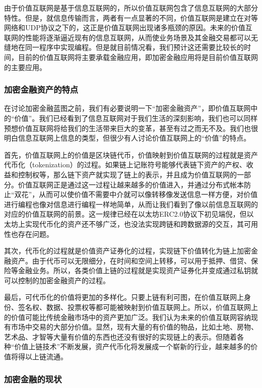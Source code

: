 \documentclass[a4paper,12pt]{article}
\begin{document}
由于价值互联网是基于信息互联网的，所以价值互联网包含了信息互联网的大部分特性。但是，就信息传输而言，两者有一点显著的不同，价值互联网是建立在对等网络和UDP协议之下的，这正是价值互联网出现诸多瓶颈的原因。未来的价值互联网的性能将逐渐逼近现有的信息互联网，从而使业务场景及其金融交易都可以无缝地在同一程序中实现编程。但是就目前情况看，我们预计这还需要比较长的时间，目前的价值互联网将主要承载金融应用，即加密金融应用将是目前价值互联网的主要应用。

\subsubsection{加密金融资产的特点}

在讨论加密金融蓝图之前，我们有必要说明一下“加密金融资产”，即价值互联网中的“价值”。我们已经看到了信息互联网对于我们生活的深刻影响，我们也可以同样预想价值互联网将给我们的生活带来巨大的变革，甚至有过之而无不及。我们也很明白信息互联网上信息的类型，但很少有人讨论价值互联网上的“价值”的特点。

首先，价值互联网上的价值是区块链代币，价值映射到价值互联网的过程就是资产代币化（tokenization）的过程。如果链上记账符号能够代表链下资产的产权、收益和控制权等，那么链下资产就实现了链上的表示，并且成为价值互联网的一部分。价值互联网正是通过这一过程让越来越多的价值进入，并通过分布式帐本防止“双花”，从而可以使价值不需要中介就可以像转移像发送信息一样方便，对价值进行编程也像对信息进行编程一样地简单，从而让我们看到了像以前信息互联网的对应的价值互联网的前景。这一规律已经在以太坊ERC2.0协议下初见端倪，但以太坊上实现代币化的资产还不够广泛，也没法实现跨链和跨数据源的交互，其可用性也存在问题。

其次，代币化的过程就是价值资产证券化的过程，实现链下价值转化为链上加密金融资产。由于代币可以无限细分，在时间和空间上转移，可以用于抵押、借贷、保险等金融业务。所以，各类价值上链的过程就是实现资产证券化并变成通过私钥就可以控制的加密金融资产的过程。

最后，可代币化的价值将更加的多样化。只要上链有利可图，在价值互联网上身份、签名权、数据、投票权等都可能被映射到价值互联网上。所以，价值互联网上的价值可能比传统金融市场中的资产更加广泛。我们认为未来的价值互联网容纳现有市场中交易的大部分价值。显然，现有大量的有价值的物品，比如土地、房物、艺术品、才智等大量有价值的东西也还没有很好的实现链上的表示。但随着各种“价值上链技术”不断发展，资产代币化将发展成一个崭新的行业，越来越多的价值将得以上链流通。

\subsubsection{加密金融的现状}
\end{document}
